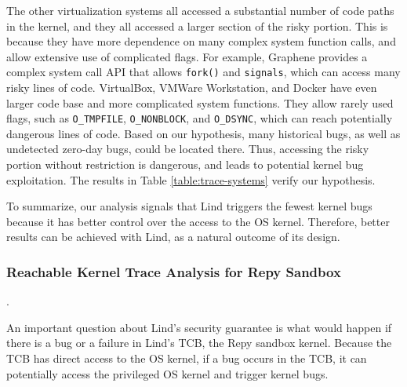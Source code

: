 The other virtualization systems all accessed a substantial number of code
paths in the kernel,
and they all accessed a larger section of the risky portion.
This is because they have
more dependence on many complex system function calls, and
allow extensive use of complicated flags. For example,
Graphene provides a complex system call API that allows
\texttt{fork()} and \texttt{signals}, which can access many risky lines of code.
VirtualBox, VMWare Workstation, and Docker have even larger
code base and more complicated system functions. They allow
rarely used flags, such as \texttt{O\_TMPFILE}, \texttt{O\_NONBLOCK},
and \texttt{O\_DSYNC}, which can reach potentially dangerous lines
of code.
%
Based on our hypothesis, many historical bugs, as well as undetected
zero-day bugs, could be located there.
Thus, accessing the risky portion without restriction is dangerous, and
leads to potential kernel bug exploitation. The results in Table
\ref{table:trace-systems} verify our hypothesis.

To summarize, our analysis signals that Lind triggers the fewest kernel bugs because
it has better control over the access to the OS kernel.
Therefore, better results can be achieved with Lind, as a natural
outcome of its design.

\subsubsection{Reachable Kernel Trace Analysis for Repy Sandbox} .
\label{Reachable-Kernel-Trace-Analysis-for-Repy-Sandbox}

An important question about Lind's security guarantee is what would happen if
there is a bug or a failure in Lind's TCB,
the Repy sandbox kernel. Because the TCB has direct access to the OS
kernel, if a bug occurs in the TCB,
it can potentially access the privileged OS kernel and trigger kernel bugs.

